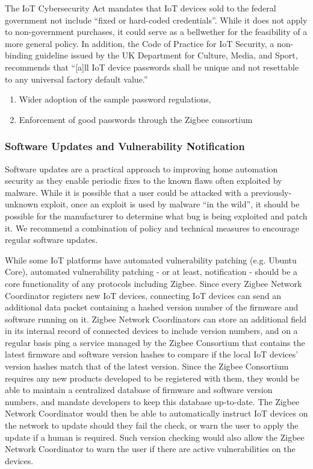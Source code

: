  The IoT Cybersecurity Act mandates that IoT devices sold to the federal government not include “fixed or hard-coded credentials”. While it does not apply to non-government purchases, it could serve as a bellwether for the feasibility of a more general policy. In addition, the Code of Practice for IoT Security, a non-binding guideline issued by the UK Department for Culture, Media, and Sport, recommends that “[a]ll IoT device passwords shall be unique and not resettable to any universal factory default value.” 

\begin{enumerate}
\item Wider adoption of the sample password regulations,
\item Enforcement of good passwords through the Zigbee consortium
\end{enumerate}



\subsubsection{Software Updates and Vulnerability Notification}
Software updates are a practical approach to improving home automation security as they enable periodic fixes to the known flaws often exploited by malware. While it is possible that a user could be attacked with a previously-unknown exploit, once an exploit is used by malware “in the wild”, it should be possible for the manufacturer to determine what bug is being exploited and patch it. We recommend a combination of policy and technical measures to encourage regular software updates.

 While some IoT platforms have automated vulnerability patching (e.g. Ubuntu Core), automated vulnerability patching - or at least, notification - should be a core functionality of any protocols including Zigbee. Since every Zigbee Network Coordinator registers new IoT devices, connecting IoT devices can send an additional data packet containing a hashed version number of the firmware and software running on it. Zigbee Network Coordinators can store an additional field in its internal record of connected devices to include version numbers, and on a regular basis ping a service managed by the Zigbee Consortium that contains the latest firmware and software version hashes to compare if the local IoT devices’ version hashes match that of the latest version. Since the Zigbee Consortium requires any new products developed to be registered with them, they would be able to maintain a centralized database of firmware and software version numbers, and mandate developers to keep this database up-to-date. The Zigbee Network Coordinator would then be able to automatically instruct IoT devices on the network to update should they fail the check, or warn the user to apply the update if a human is required. Such version checking would also allow the Zigbee Network Coordinator to warn the user if there are active vulnerabilities on the devices.

